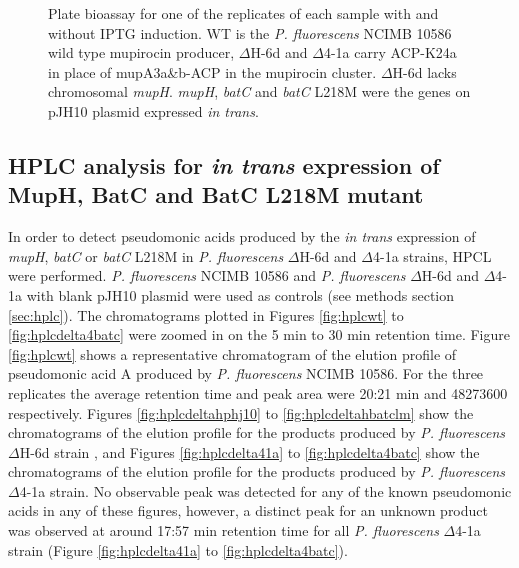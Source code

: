 	
		\setlength\fboxsep{5pt}
		\setlength\fboxrule{1.5pt}
		\begin{figure}
		\centering
		\caption[Plate bioassay for one of the replicates of each sample with and without IPTG induction.]{Plate bioassay for one of the replicates of each sample with and without IPTG induction. WT is the \textit{P. fluorescens} NCIMB 10586 wild type mupirocin producer, $ \Delta $H-6d and $ \Delta $4-1a carry ACP-K24a in place of mupA3a\&b-ACP in the mupirocin cluster. $ \Delta $H-6d lacks chromosomal \textit{mupH}. \textit{mupH}, \textit{batC} and \textit{batC} L218M were the genes on pJH10 plasmid expressed \textit{in trans}.}
		\label{fig:bioassayplates}
		\end{figure}		
\newpage
	\subsection{HPLC analysis for \textit{in trans} expression of MupH, BatC and BatC L218M mutant}
	\label{sec:chap4HPLC}
	In order to detect pseudomonic acids produced by the \textit{in trans} expression of \textit{mupH}, \textit{batC} or \textit{batC} L218M in \textit{P. fluorescens} $ \Delta $H-6d and $ \Delta $4-1a strains, HPCL were performed. \textit{P. fluorescens} NCIMB 10586 and \textit{P. fluorescens}  $ \Delta $H-6d and $ \Delta $4-1a with blank pJH10 plasmid were used as controls (see methods section \ref{sec:hplc}). The chromatograms plotted in Figures \ref{fig:hplcwt} to \ref{fig:hplcdelta4batc} were zoomed in on the 5 min to 30 min retention time. Figure \ref{fig:hplcwt} shows a representative chromatogram of the elution profile of pseudomonic acid A produced by \textit{P. fluorescens} NCIMB 10586. For the three replicates the average retention time and peak area were 20:21 min and 48273600 respectively. Figures \ref{fig:hplcdeltahphj10} to \ref{fig:hplcdeltahbatclm} show the chromatograms of the elution profile for the products produced by \textit{P. fluorescens} $ \Delta $H-6d strain , and Figures \ref{fig:hplcdelta41a} to \ref{fig:hplcdelta4batc} show the chromatograms of the elution profile for the products produced by \textit{P. fluorescens} $ \Delta $4-1a strain. No observable peak was detected for any of the known pseudomonic acids in any of these figures, however, a distinct peak for an unknown product was observed at around 17:57 min retention time for all \textit{P. fluorescens} $ \Delta $4-1a strain (Figure \ref{fig:hplcdelta41a} to \ref{fig:hplcdelta4batc}). 
	
